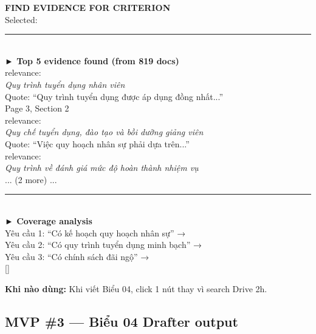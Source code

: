 \documentclass[11pt,a4paper]{article}
\begin{document}
\begin{mockbox}
{\bfseries\color{ink} FIND EVIDENCE FOR CRITERION}\\[2pt]
{\color{mid} Selected: }\\[6pt]
\rule{\linewidth}{0.3pt}\\[4pt]
{\bfseries\color{ink} ► Top 5 evidence found (from 819 docs)}\\[2pt]
  \quad relevance: \\
\quad \textit{Quy trình tuyển dụng nhân viên}\\
\quad \textcolor{mid}{Quote: ``Quy trình tuyển dụng được áp dụng đồng nhất...''}\\
\quad \textcolor{mid}{Page 3, Section 2}\\[3pt]
  \quad relevance: \\
\quad \textit{Quy chế tuyển dụng, đào tạo và bồi dưỡng giảng viên}\\
\quad \textcolor{mid}{Quote: ``Việc quy hoạch nhân sự phải dựa trên...''}\\[3pt]
  \quad relevance: \\
\quad \textit{Quy trình về đánh giá mức độ hoàn thành nhiệm vụ}\\[3pt]
... (2 more) ...\\[6pt]
\rule{\linewidth}{0.3pt}\\[4pt]
{\bfseries\color{ink} ► Coverage analysis}\\[2pt]
Yêu cầu 1: ``Có kế hoạch quy hoạch nhân sự'' → \\
Yêu cầu 2: ``Có quy trình tuyển dụng minh bạch'' → \\
Yêu cầu 3: ``Có chính sách đãi ngộ'' → \\[4pt]
{[] }
\end{mockbox}

\textbf{Khi nào dùng:} Khi viết Biểu 04, click 1 nút thay vì search Drive 2h.

\subsection{MVP \#3 — Biểu 04 Drafter output}
\end{document}
